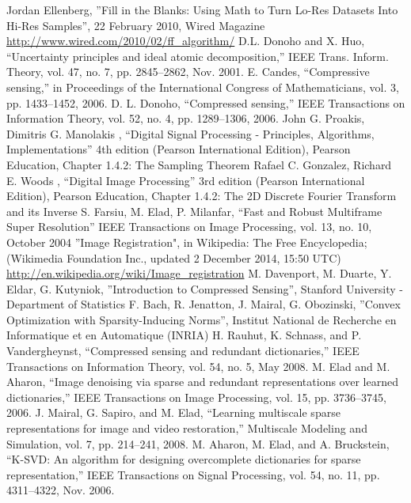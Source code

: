 \begin{thebibliography}{99}
 Jordan Ellenberg, ”Fill in the Blanks: Using Math to Turn Lo-Res Datasets Into Hi-Res Samples”, 22 February 2010, Wired Magazine \url{http://www.wired.com/2010/02/ff_algorithm/}
 D.L. Donoho and X. Huo, “Uncertainty principles and ideal atomic decomposition,” IEEE Trans. Inform. Theory, vol. 47, no. 7, pp. 2845–2862, Nov. 2001.
 E. Candes, “Compressive sensing,” in Proceedings of the International Congress of Mathematicians, vol. 3, pp. 1433–1452, 2006.
 D. L. Donoho, “Compressed sensing,” IEEE Transactions on Information Theory, vol. 52, no. 4, pp. 1289–1306, 2006.
 John G. Proakis, Dimitris G. Manolakis , “Digital Signal Processing - Principles, Algorithms, Implementations” 4th edition (Pearson International Edition), Pearson Education, Chapter 1.4.2: The Sampling Theorem 
 Rafael C. Gonzalez, Richard E. Woods , “Digital Image Processing” 3rd edition (Pearson International Edition), Pearson Education, Chapter 1.4.2: The 2D Discrete Fourier Transform and its Inverse
 S. Farsiu, M. Elad, P. Milanfar, “Fast and Robust Multiframe Super Resolution” IEEE Transactions on Image Processing, vol. 13, no. 10, October 2004
 ”Image Registration", in Wikipedia: The Free Encyclopedia; (Wikimedia Foundation Inc., updated 2 December 2014, 15:50 UTC) \url{http://en.wikipedia.org/wiki/Image_registration}
 M. Davenport, M. Duarte, Y. Eldar, G. Kutyniok, ”Introduction to Compressed Sensing”, Stanford University - Department of Statistics
 F. Bach, R. Jenatton, J. Mairal, G. Obozinski, ”Convex Optimization with Sparsity-Inducing Norms”, Institut National de Recherche en Informatique et en Automatique (INRIA)
 H. Rauhut, K. Schnass, and P. Vandergheynst, “Compressed sensing and redundant dictionaries,” IEEE Transactions on Information Theory, vol. 54, no. 5, May 2008.
 M. Elad and M. Aharon, “Image denoising via sparse and redundant representations over learned dictionaries,” IEEE Transactions on Image Processing, vol. 15, pp. 3736–3745, 2006.
 J. Mairal, G. Sapiro, and M. Elad, “Learning multiscale sparse representations for image and video restoration,” Multiscale Modeling and Simulation, vol. 7, pp. 214–241, 2008.
 M. Aharon, M. Elad, and A. Bruckstein, “K-SVD: An algorithm for designing overcomplete dictionaries for sparse representation,” IEEE Transactions on Signal Processing, vol. 54, no. 11, pp. 4311–4322, Nov. 2006.

\end{thebibliography}
